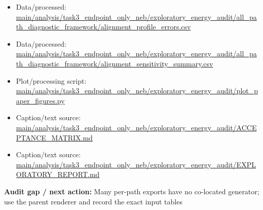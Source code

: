 \documentclass[10pt]{article}
\newcommand{\statusline}[1]{\colorbox{gray!12}{\parbox{0.96\linewidth}{#1}}}
\begin{document}
\begin{itemize}[leftmargin=1.4em,noitemsep]
\item Data/processed: \begingroup\scriptsize\url{main/analysis/task3_endpoint_only_neb/exploratory_energy_audit/all_path_diagnostic_framework/alignment_profile_errors.csv}\endgroup
\item Data/processed: \begingroup\scriptsize\url{main/analysis/task3_endpoint_only_neb/exploratory_energy_audit/all_path_diagnostic_framework/alignment_sensitivity_summary.csv}\endgroup
\item Plot/processing script: \begingroup\scriptsize\url{main/analysis/task3_endpoint_only_neb/exploratory_energy_audit/plot_paper_figures.py}\endgroup
\item Caption/text source: \begingroup\scriptsize\url{main/analysis/task3_endpoint_only_neb/exploratory_energy_audit/ACCEPTANCE_MATRIX.md}\endgroup
\item Caption/text source: \begingroup\scriptsize\url{main/analysis/task3_endpoint_only_neb/exploratory_energy_audit/EXPLORATORY_REPORT.md}\endgroup
\end{itemize}
\statusline{\textbf{Audit gap / next action:} Many per-path exports have no co-located generator; use the parent renderer and record the exact input tables}
\vfill
\clearpage
\end{document}
